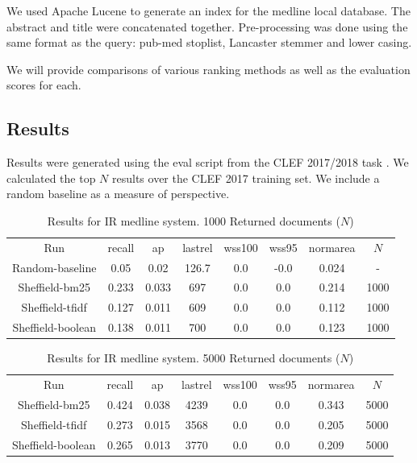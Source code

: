 We used Apache Lucene to generate an index for the medline local database. The abstract and title were concatenated together. Pre-processing was done using the same format as the query: pub-med stoplist, Lancaster stemmer and lower casing. 

We will provide comparisons of various ranking methods as well as the evaluation scores for each. 

\subsection{Results}

Results were generated using the eval script from the CLEF 2017/2018 task \cite{Kanoulas12017}. We calculated the top $N$ results over the CLEF 2017 training set. We include a random baseline as a measure of perspective. 


\begin{table}[H]
\centering
\begin{tabular}{|c|c|c|c|c|c|c|c|} 
 \hline
 Run & recall &  ap & lastrel & wss100 & wss95 & normarea & $N$ \\ 
 Random-baseline & 0.05 &0.02 & 126.7 &0.0 &-0.0 & 0.024 & - \\
  Sheffield-bm25 & 0.233 &0.033 & 697 &0.0 &0.0 & 0.214 & 1000 \\
  Sheffield-tfidf & 0.127 &0.011 & 609 &0.0 &0.0 & 0.112 & 1000 \\
  Sheffield-boolean & 0.138 &0.011 & 700 &0.0 &0.0 & 0.123 & 1000 \\
 \hline
\end{tabular}
\caption{Results for IR medline system. 1000 Returned documents ($N$)}
\end{table}


\begin{table}[H]
\centering
\begin{tabular}{|c|c|c|c|c|c|c|c|} 
 \hline
 Run & recall &  ap & lastrel & wss100 & wss95 & normarea & $N$ \\ 
  Sheffield-bm25 & 0.424 &0.038 & 4239 &0.0 &0.0 & 0.343 & 5000 \\
  Sheffield-tfidf & 0.273 &0.015 & 3568 &0.0 &0.0 & 0.205 & 5000 \\
  Sheffield-boolean & 0.265 &0.013 & 3770 &0.0 &0.0 & 0.209 & 5000 \\
 \hline
\end{tabular}
\caption{Results for IR medline system. 5000 Returned documents ($N$)}
\end{table}

